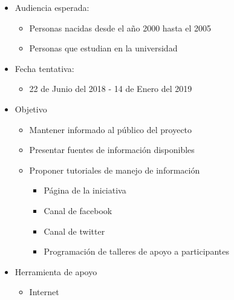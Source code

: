 \documentclass{article}
\begin{document}
\begin{enumerate}
\begin{itemize}
\item Audiencia esperada:
\begin{itemize}
\item Personas nacidas desde el año 2000 hasta el 2005
\item Personas que estudian en la universidad
\end{itemize}
\item Fecha tentativa:
\begin{itemize}
\item 22 de Junio del 2018 - 14 de Enero del 2019
\end{itemize}
\item Objetivo
\begin{itemize}
\item Mantener informado al público del proyecto
\item Presentar fuentes de información disponibles
\item Proponer tutoriales de manejo de información
\begin{itemize}
\item Página de la iniciativa 
\item Canal de facebook
\item Canal de twitter
\item Programación de talleres de apoyo a participantes
\end{itemize}
\end{itemize}
\item Herramienta de apoyo
\begin{itemize}
\item Internet
\end{itemize}
\end{itemize}


\end{enumerate}
\end{document}
